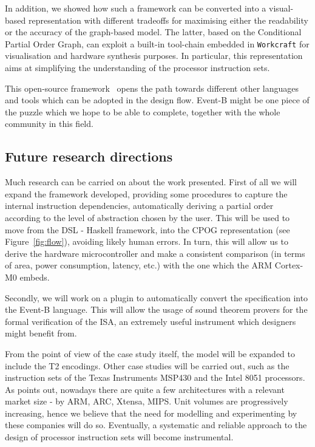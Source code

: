\documentclass[conference]{IEEEtran}
\begin{document}
In addition, we showed how such a framework can be converted into a visual-based
representation with different tradeoffs for maximising either the readability or the accuracy
of the graph-based model. The latter, based on the Conditional Partial Order Graph, can
exploit a built-in tool-chain embedded in \verb|Workcraft| for visualisation and hardware
synthesis purposes. In particular, this representation aims at simplifying the understanding of
the processor instruction sets.

This open-source framework~\cite{repo} opens the path towards different other languages and tools which
can be adopted in the design flow. Event-B might be one piece of the puzzle which we
hope to be able to complete, together with the whole community in this field.

\subsection{Future research directions}
\label{sec:frd}
Much research can be carried on about the work presented. First of all we will expand the
framework developed, providing some procedures to capture the internal instruction
dependencies, automatically deriving a partial order according to the level of abstraction
chosen by the user. This will be used to move from the DSL - Haskell framework, into the CPOG
representation (see Figure~\ref{fig:flow}), avoiding likely human errors. In turn, this will
allow us to derive the hardware microcontroller and make a consistent comparison (in terms of
area, power consumption, latency, etc.) with the one which the ARM Cortex-M0 embeds.

Secondly, we will work on a plugin to automatically convert the specification into the
Event-B language. This will allow the usage of sound theorem provers for the formal
verification of the ISA, an extremely useful instrument which designers might benefit from.

From the point of view of the case study itself, the model will be expanded to include the
T2 encodings. Other case studies will be carried out, such as the instruction
sets of the Texas Instruments MSP430 and the Intel 8051 processors. As \cite{webArticle} points out,
nowadays there are quite a few architectures with a relevant market size -
by ARM, ARC, Xtensa, MIPS. Unit volumes are progressively increasing, hence we believe that the
need for modelling and experimenting by these companies will do so. Eventually, a systematic 
and reliable approach to the design of processor instruction sets will become instrumental.
\end{document}
